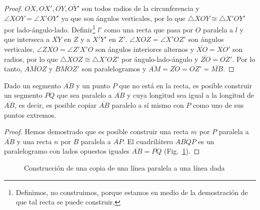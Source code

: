 \begin{proof}
$\overline{OX}, \overline{OX'}, \overline{OY}, \overline{OY'}$ son todos radios de la circunferencia y $\angle XOY = \angle X'OY'$ ya que son ángulos verticales, por lo que $\triangle XOY\cong\triangle X'OY'$ por lado-ángulo-lado. Definir\footnote{Definimos, no construimos, porque estamos en medio de la demostración de que tal recta se puede construir.} $l'$ como una recta que pasa por $O$ paralela a $l$ y que interseca a $\overline{XY}$ en $Z$ y a $\overline{X'Y'}$ en $Z'$. $\angle XOZ=\angle X'OZ'$ son ángulos verticales, $\angle ZXO=\angle Z'X'O$ son ángulos interiores alternos y $\overline{XO}=\overline{XO'}$ son radios, por lo que $\triangle XOZ\cong\triangle X'OZ'$ por ángulo-lado-ángulo y $\overline{ZO}=\overline{OZ'}$. Por lo tanto, $\overline{AMOZ}$ y $\overline{BMOZ'}$ son paralelogramos y $\overline{AM}=\overline{ZO}=\overline{OZ'}=\overline{MB}$.
\end{proof}

\begin{theorem}\label{thm.parallel-equal}
Dado un segmento $\overline{AB}$ y un punto $P$ que no está en la recta, es posible construir un segmento $\overline{PQ}$ que sea paralelo a $\overline{AB}$ y cuya longitud sea igual a la longitud de $\overline{AB}$, es decir, es posible copiar $\overline{AB}$ paralelo a sí mismo con $P$ como uno de sus puntos extremos.
\end{theorem}

\newpage

\begin{proof}
Hemos demostrado que es posible construir una recta $m$ por $P$ paralela a $\overline{AB}$ y una recta $n$ por $B$ paralela a $\overline{AP}$. El cuadrilátero $\overline{ABQP}$ es un paralelogramo con lados opuestos iguales $\overline{AB}=\overline{PQ}$ (Fig.~\ref{f.se-parallel-other4}).
\end{proof}

\begin{figure}%
\begin{center}
\end{center}
\caption{Construcción de una copia de una línea paralela a una línea dada}\label{f.se-parallel-other4}
\end{figure}

